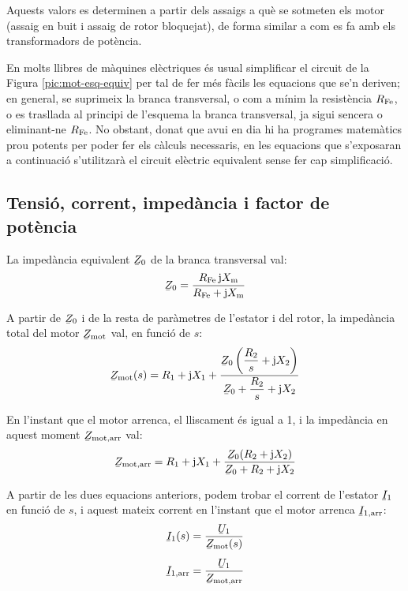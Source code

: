 Aquests valors es determinen a partir dels assaigs a què se sotmeten els motor (assaig en buit i assaig de rotor bloquejat), de forma similar a com es fa amb els transformadors de potència.

En molts llibres de màquines elèctriques és usual simplificar el circuit de la Figura  \vref{pic:mot-esq-equiv} per tal de fer més fàcils les equacions que se'n deriven; en general, se suprimeix la branca transversal, o com a mínim la resistència $R_\mathrm{Fe}$, o es trasllada al principi de l'esquema la branca transversal, ja sigui sencera o eliminant-ne  $R_\mathrm{Fe}$. No obstant, donat que avui en dia hi ha programes matemàtics prou potents per poder fer els càlculs necessaris, en les equacions que s'exposaran a continuació s'utilitzarà el circuit elèctric equivalent sense fer cap simplificació.

\subsection{Tensió, corrent, impedància i factor de potència}\label{sec:mot-u-c-i}

La impedància equivalent $\cmplx{Z}_0$ de la branca transversal val:
\begin{equation}\label{eq:mot-Z0}
    \cmplx{Z}_0 = \frac{R\ped{Fe} \, \ju X\ped{m}}{ R\ped{Fe} + \ju X\ped{m}}
\end{equation}

A partir de $\cmplx{Z}_0$ i de la resta de paràmetres de l'estator i del rotor, la impedància total del motor $\cmplx{Z}\ped{mot}$ val,  en funció de $s$:
\begin{equation}\label{eq:mot-Zmot}\index{motors d'inducció!impedància}
    \cmplx{Z}\ped{mot}(s) = R_1 + \ju X_1 + \frac{\cmplx{Z}_0 \left( \dfrac{R_2}{s} + \ju X_2\right)}{\cmplx{Z}_0 +  \dfrac{R_2}{s} + \ju X_2}
\end{equation}

En l'instant que el motor arrenca, el lliscament és igual a 1, i la impedància en aquest moment $\cmplx{Z}\ped{mot,arr}$ val:
\begin{equation}\label{eq:z-mot-arr}
    \cmplx{Z}\ped{mot,arr} = R_1 + \ju X_1 + \frac{\cmplx{Z}_0 ( R_2 + \ju X_2)}{\cmplx{Z}_0 +  R_2 + \ju X_2}
\end{equation}

A partir de les dues equacions anteriors, podem trobar el corrent de l'estator  $\cmplx{I}_1$ en funció de $s$, i aquest mateix corrent en l'instant que el motor arrenca $\cmplx{I}\ped{1,arr}$:
\begin{subequations}\index{motors d'inducció!corrent d'arrencada}\index{motors d'inducció!corrent}
\begin{align}
    \cmplx{I}_1(s) &= \frac{\cmplx{U}_1}{\cmplx{Z}\ped{mot}(s)}\label{eq:I1-mot} \\[1ex]
    \cmplx{I}\ped{1,arr} &= \frac{\cmplx{U}_1}{\cmplx{Z}\ped{mot,arr}}\label{eq:I1-mot-arr}
\end{align}
\end{subequations}

